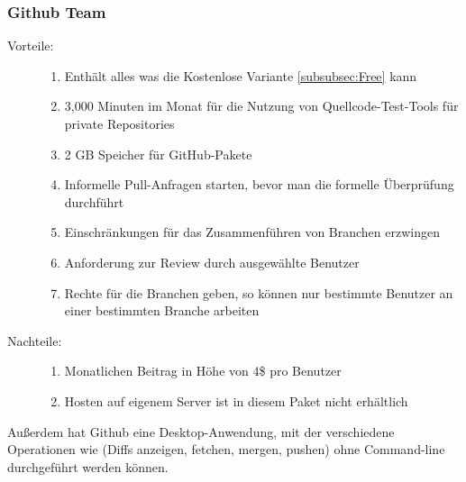 \subsubsection{Github Team}
\label{subsubsec:Team}

\begin{description}
	\item [Vorteile:] \hfill
	\begin{enumerate}
		\item Enthält alles was die Kostenlose Variante \cref{subsubsec:Free} kann
		\item 3,000 Minuten im Monat für die Nutzung von Quellcode-Test-Tools für private Repositories
		\item 2 GB Speicher für GitHub-Pakete
		\item Informelle Pull-Anfragen starten, bevor man die formelle Überprüfung durchführt
		\item Einschränkungen für das Zusammenführen von Branchen erzwingen
		\item Anforderung zur Review durch ausgewählte Benutzer
		\item Rechte für die Branchen geben, so können nur bestimmte Benutzer an einer bestimmten Branche arbeiten
	\end{enumerate}
	\item [Nachteile:] \hfill
	\begin{enumerate}
		\item Monatlichen Beitrag in Höhe von 4\$ pro Benutzer
		\item Hosten auf eigenem Server ist in diesem Paket nicht erhältlich
	\end{enumerate}
\end{description}

Außerdem hat Github eine Desktop-Anwendung, mit der verschiedene Operationen wie (Diffs anzeigen, fetchen, mergen, pushen) ohne Command-line durchgeführt werden können.

